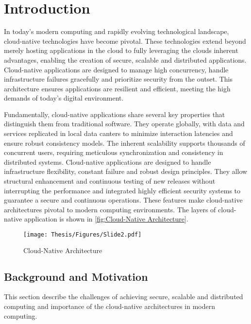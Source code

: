 \chapter[Introduction]{Introduction}
In today’s modern computing and rapidly evolving technological landscape, cloud-native technologies have become pivotal. These technologies extend beyond merely hosting applications in the cloud to fully leveraging the clouds inherent advantages, enabling the creation of secure, scalable and distributed applications. Cloud-native applications are designed to manage high concurrency, handle infrastructure failures gracefully and prioritize security from the outset. This architecture ensures applications are resilient and efficient, meeting the high demands of today's digital environment. \cite{r1}

Fundamentally, cloud-native applications share several key properties that distinguish them from traditional software. They operate globally, with data and services replicated in local data canters to minimize interaction latencies and ensure robust consistency models. The inherent scalability supports thousands of concurrent users, requiring meticulous synchronization and consistency in distributed systems. Cloud-native applications are designed to handle infrastructure flexibility, constant failure and robust design principles. They allow structural enhancement and continuous testing of new releases without interrupting the performance and integrated highly efficient security systems to guarantee a secure and continuous operations. These features make cloud-native architectures pivotal to modern computing environments. The layers of cloud-native application is shown in \autoref{fig:Cloud-Native Architecture}. \cite{r1}


\captionsetup{justification=centering}
\begin{figure}[h]
\centering

\texttt{[image: Thesis/Figures/Slide2.pdf]}
\caption{\label{fig:Cloud-Native Architecture}Cloud-Native Architecture \cite{r3}}
\end{figure}

\section{Background and Motivation}


This section describe the challenges of achieving secure, scalable and distributed computing and importance of the cloud-native architectures in modern computing.


